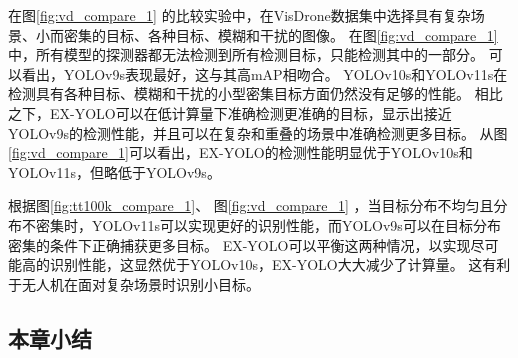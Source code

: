 
在图\ref{fig:vd_compare_1}
的比较实验中，在VisDrone数据集中选择具有复杂场景、小而密集的目标、各种目标、模糊和干扰的图像。
在图\ref{fig:vd_compare_1}中，所有模型的探测器都无法检测到所有检测目标，只能检测其中的一部分。 可以看出，YOLOv9s表现最好，这与其高mAP相吻合。 YOLOv10s和YOLOv11s在检测具有各种目标、模糊和干扰的小型密集目标方面仍然没有足够的性能。 相比之下，EX-YOLO可以在低计算量下准确检测更准确的目标，显示出接近YOLOv9s的检测性能，并且可以在复杂和重叠的场景中准确检测更多目标。 从图\ref{fig:vd_compare_1}可以看出，EX-YOLO的检测性能明显优于YOLOv10s和YOLOv11s，但略低于YOLOv9s。

根据图\ref{fig:tt100k_compare_1}、
图\ref{fig:vd_compare_1}
，当目标分布不均匀且分布不密集时，YOLOv11s可以实现更好的识别性能，而YOLOv9s可以在目标分布密集的条件下正确捕获更多目标。 EX-YOLO可以平衡这两种情况，以实现尽可能高的识别性能，这显然优于YOLOv10s，EX-YOLO大大减少了计算量。 这有利于无人机在面对复杂场景时识别小目标。

\subsection{本章小结}

